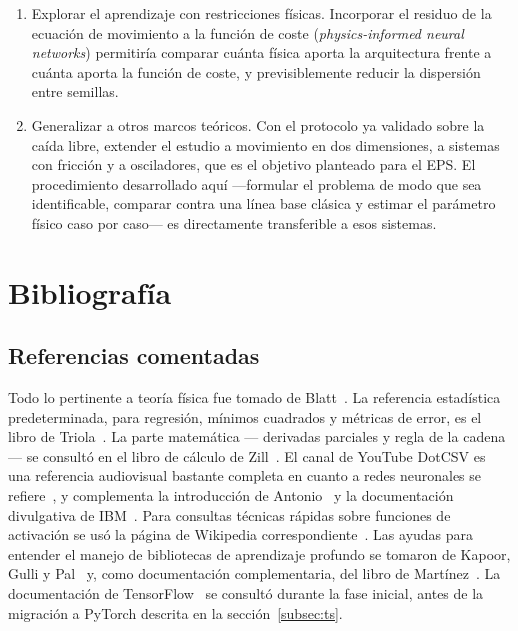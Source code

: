 \documentclass[titlepage,11pt]{article}
\begin{document}
\begin{enumerate}
\item Explorar el aprendizaje con restricciones físicas. Incorporar el
  residuo de la ecuación de movimiento a la función de coste (\emph{physics-informed
  neural networks}) permitiría comparar cuánta física aporta la arquitectura
  frente a cuánta aporta la función de coste, y previsiblemente reducir la
  dispersión entre semillas.

\item Generalizar a otros marcos teóricos. Con el protocolo ya validado
  sobre la caída libre, extender el estudio a movimiento en dos dimensiones, a
  sistemas con fricción y a osciladores, que es el objetivo planteado para el
  EPS. El procedimiento desarrollado aquí ---formular el problema de modo que sea
  identificable, comparar contra una línea base clásica y estimar el parámetro
  físico caso por caso--- es directamente transferible a esos sistemas.
\end{enumerate}


\section{Bibliografía}
\label{sec:biografia}

\subsection*{Referencias comentadas}
\label{sec:referencias}

Todo lo pertinente a teoría física fue tomado de Blatt~\cite{Fisica}. La
referencia estadística predeterminada, para regresión, mínimos cuadrados y
métricas de error, es el libro de Triola~\cite{triola_2018_estadstica}. La parte
matemática --- derivadas parciales y regla de la cadena --- se consultó en el
libro de cálculo de Zill~\cite{zill_1985_clculo}. El canal de YouTube DotCSV es
una referencia audiovisual bastante completa en cuanto a redes neuronales se
refiere~\cite{santana_2018_1,santana_2018_2,santana_2018_3,santana_2018_3_5}, y
complementa la introducción de Antonio~\cite{antonio_2023_introduccin} y la
documentación divulgativa de IBM~\cite{ibm_qu}. Para consultas técnicas rápidas
sobre funciones de activación se usó la página de Wikipedia
correspondiente~\cite{wikipediacontributors_2018_activation}. Las ayudas para
entender el manejo de bibliotecas de aprendizaje profundo se tomaron de Kapoor,
Gulli y Pal~\cite{Amita} y, como documentación complementaria, del libro de
Martínez~\cite{Jesus}. La documentación de TensorFlow~\cite{TensorFlow} se
consultó durante la fase inicial, antes de la migración a PyTorch descrita en
la sección~\ref{subsec:ts}.



\end{document}
